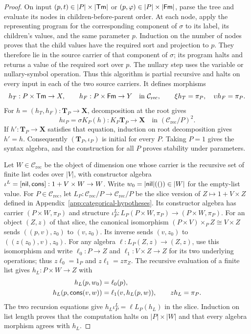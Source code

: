 \begin{proof}
On input $(p,t)\in|P|\times|\mathsf{Tm}|$ or
$(p,\varphi)\in|P|\times|\mathsf{Fm}|$, parse the tree and evaluate its
nodes in children-before-parent order. At each node, apply the
representing program for the corresponding component of $\sigma$
to its label, its children's values, and the same parameter $p$.
Induction on the number of nodes proves that the child values
have the required sort and projection to $p$. They therefore lie
in the source carrier of that component of $\sigma$; its program
halts and returns a value of the required sort over $p$.
The nullary step uses the variable or nullary-symbol operation.
Thus this algorithm is partial recursive and halts on every input
in each of the two source carriers. It defines morphisms
\[
 h_T:P\times\mathsf{Tm}\to X,\qquad h_F:P\times\mathsf{Fm}\to Y
 \quad\text{in }\mathcal C_{\mathrm{rec}},
 \qquad \xi h_T=\pi_P,\quad\upsilon h_F=\pi_P.
\]
For $h=(h_T,h_F):\mathbf T_P\to\mathbf X$, decomposition at
the root gives
\[
 h\iota_P=\sigma K_P(h):K_P\mathbf T_P\to\mathbf X
 \quad\text{in }(\mathcal C_{\mathrm{rec}}/P)^2.
\]
If $h':\mathbf T_P\to\mathbf X$ satisfies that equation,
induction on root decomposition gives $h'=h$.
Consequently $(\mathbf T_P,\iota_P)$ is initial for every $P$.
Taking $P=1$ gives the syntax algebra, and the construction for
all $P$ proves stability under parameters.

Let $W\in\mathcal C_{\mathrm{rec}}$ be the object of dimension
one whose carrier is the recursive set of finite list codes over $|V|$, with constructor algebra
$\iota^L=[\mathsf{nil},\mathsf{cons}]:1+V\times W\to W$.
Write $w_0=|\mathsf{nil}|(())\in|W|$ for the empty-list value.
For $P\in\mathcal C_{\mathrm{rec}}$, let
$L_P:\mathcal C_{\mathrm{rec}}/P\to\mathcal C_{\mathrm{rec}}/P$
be the slice version of $Z\mapsto1+V\times Z$ defined in
Appendix~\ref{app:categorical-hypotheses}.
Its constructor algebra has carrier $(P\times W,\pi_P)$ and
structure $\iota^L_P:L_P(P\times W,\pi_P)\to(P\times W,\pi_P)$.
For an object $(Z,z)$ of that slice, the canonical isomorphism
$(P\times V)\times_P Z\cong V\times Z$
sends $((p,v),z_0)$ to $(v,z_0)$. Its inverse sends $(v,z_0)$
to $((z(z_0),v),z_0)$. For any algebra
$\ell:L_P(Z,z)\to(Z,z)$, use this isomorphism and write
$\ell_0:P\to Z$ and $\ell_1:V\times Z\to Z$ for its
two underlying operations; thus $z\ell_0=1_P$ and
$z\ell_1=z\pi_Z$.
The recursive evaluation of a finite list gives
$h_L:P\times W\to Z$ with
\[
 \begin{aligned}
 h_L(p,w_0)&=\ell_0(p),\\
 h_L(p,\mathsf{cons}(v,w))&=\ell_1(v,h_L(p,w)),\qquad
 zh_L=\pi_P.
 \end{aligned}
\]
The two recursion equations give $h_L\iota^L_P=\ell L_P(h_L)$
in the slice. Induction on list length proves that the computation
halts on $|P|\times|W|$ and that every algebra morphism agrees with
$h_L$.



\end{proof}
